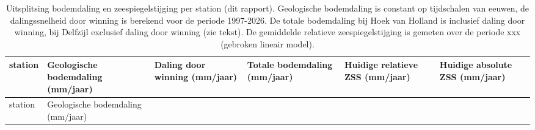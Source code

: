 \documentclass[ddraft]{deltares_report}
\begin{document}
\begin{longtable}[]{@{}
  >{\raggedright\arraybackslash}p{}
  >{\raggedright\arraybackslash}p{}
  >{\raggedright\arraybackslash}p{}
  >{\raggedright\arraybackslash}p{}
  >{\raggedright\arraybackslash}p{}
  >{\raggedright\arraybackslash}p{}@{}}
\caption{Uitsplitsing bodemdaling \citep[op basis van][ and
\citet{Hijma2026}]{Hijma2025b} en zeespiegelstijging per station (dit
rapport). Geologische bodemdaling is constant op tijdschalen van eeuwen,
de dalingssnelheid door winning is berekend voor de periode 1997-2026.
De totale bodemdaling bij Hoek van Holland is inclusief daling door
winning, bij Delfzijl exclusief daling door winning (zie tekst). De
gemiddelde relatieve zeespiegelstijging is gemeten over de periode xxx
(gebroken lineair
model).}\label{tbl-bodemdalingscomponenten}\tabularnewline
\toprule\noalign{}
\begin{minipage}[b]{\linewidth}\raggedright
station
\end{minipage} & \begin{minipage}[b]{\linewidth}\raggedright
Geologische bodemdaling (mm/jaar)
\end{minipage} & \begin{minipage}[b]{\linewidth}\raggedright
Daling door winning (mm/jaar)
\end{minipage} & \begin{minipage}[b]{\linewidth}\raggedright
Totale bodemdaling (mm/jaar)
\end{minipage} & \begin{minipage}[b]{\linewidth}\raggedright
Huidige relatieve ZSS (mm/jaar)
\end{minipage} & \begin{minipage}[b]{\linewidth}\raggedright
Huidige absolute ZSS (mm/jaar)
\end{minipage} \\
\midrule\noalign{}
\endfirsthead
\toprule\noalign{}
\begin{minipage}[b]{\linewidth}\raggedright
station
\end{minipage} & \begin{minipage}[b]{\linewidth}\raggedright
Geologische bodemdaling (mm/jaar)
\end{minipage} & \begin{minipage}[b]{\linewidth}\raggedright

\end{minipage}
\end{longtable}
\end{document}
